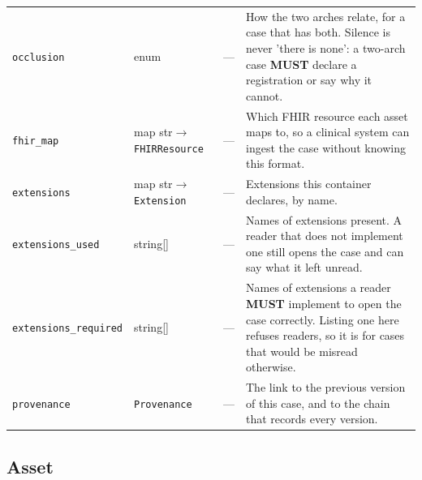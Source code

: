 \documentclass[11pt,a4paper]{article}
\newcommand{\MUST}{\textcolor{uosred}{\textbf{MUST}}}
\newcommand{\code}[1]{\texttt{\small #1}}
\begin{document}
\begin{longtable}{L{3.5cm} L{3.0cm} C{1.4cm} L{6.4cm}}
\code{occlusion} & enum & --- & How the two arches relate, for a case that has both. Silence is never 'there is none': a two-arch case \MUST{} declare a registration or say why it cannot.\\
\code{fhir\_map} & map str$\to$\code{FHIRResource} & --- & Which FHIR resource each asset maps to, so a clinical system can ingest the case without knowing this format.\\
\code{extensions} & map str$\to$\code{Extension} & --- & Extensions this container declares, by name.\\
\code{extensions\_used} & string[] & --- & Names of extensions present. A reader that does not implement one still opens the case and can say what it left unread.\\
\code{extensions\_required} & string[] & --- & Names of extensions a reader \MUST{} implement to open the case correctly. Listing one here refuses readers, so it is for cases that would be misread otherwise.\\
\code{provenance} & \code{Provenance} & --- & The link to the previous version of this case, and to the chain that records every version.\\
\bottomrule
\end{longtable}

\subsection{Asset}
\end{document}
